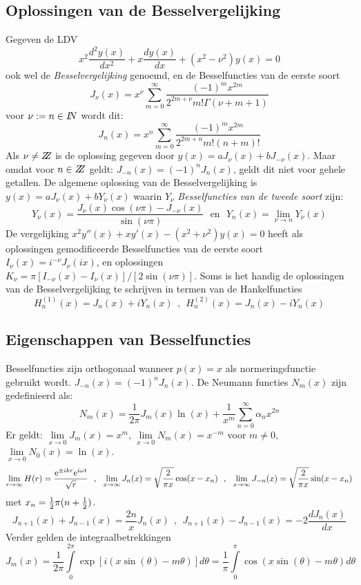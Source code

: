 \documentclass[twoside]{report}
\begin{document}
\subsection{Oplossingen van de Besselvergelijking}
Gegeven de LDV
\[
x^2\frac{d^2y(x)}{dx^2}+x\frac{dy(x)}{dx}+(x^2-\nu^2)y(x)=0
\]
ook wel de {\it Besselvergelijking} genoemd, en de Besselfuncties van de eerste
soort
\[
J_\nu(x)=x^\nu\sum_{m=0}^\infty\frac{(-1)^mx^{2m}}{2^{2m+\nu}m!\Gamma(\nu+m+1)}
\]
voor $\nu:=n\in I\hspace{-1mm}N$ wordt dit:
\[
J_n(x)=x^n\sum_{m=0}^\infty\frac{(-1)^mx^{2m}}{2^{2m+n}m!(n+m)!}
\]
Als $\nu\neq Z\hspace{-1ex}Z$ is de oplossing gegeven door $y(x)=aJ_\nu(x)+bJ_{-\nu}(x)$.
Maar omdat voor $n\in Z\hspace{-1ex}Z$ geldt: $J_{-n}(x)=(-1)^nJ_n(x)$, geldt dit niet voor
gehele getallen. De algemene oplossing van de Besselvergelijking is
$y(x)=aJ_\nu(x)+bY_\nu(x)$ waarin $Y_\nu$ {\it Besselfuncties van de tweede
soort} zijn:
\[
Y_\nu(x)=\frac{J_\nu(x)\cos(\nu\pi)-J_{-\nu}(x)}{\sin(\nu\pi)}~~~\mbox{en}~~~
Y_n(x)=\lim_{\nu\rightarrow n}Y_\nu(x)
\]
De vergelijking $x^2y''(x)+xy'(x)-(x^2+\nu^2)y(x)=0$ heeft als oplossingen
gemodificeerde Besselfuncties van de eerste soort $I_\nu(x)=i^{-\nu}J_\nu(ix)$,
en oplossingen $K_\nu=\pi[I_{-\nu}(x)-I_\nu(x)]/[2\sin(\nu\pi)]$.
\npar
Soms is het handig de oplossingen van de Besselvergelijking te schrijven in
termen van de Hankelfuncties
\[
H^{(1)}_n(x)=J_n(x)+iY_n(x)~~,~~H^{(2)}_n(x)=J_n(x)-iY_n(x)
\]

\subsection{Eigenschappen van Besselfuncties}
Besselfuncties zijn orthogonaal wanneer $p(x)=x$ als normeringsfunctie gebruikt
wordt.
\npar
$J_{-n}(x)=(-1)^nJ_n(x)$. De Neumann functies $N_m(x)$ zijn gedefinieerd als:
\[
N_m(x)=\frac{1}{2\pi}J_m(x)\ln(x)+\frac{1}{x^m}\sum_{n=0}^\infty \alpha_nx^{2n}
\]
Er geldt: $\lim\limits_{x\rightarrow0}J_m(x)=x^m$,
$\lim\limits_{x\rightarrow0}N_m(x)=x^{-m}$ voor $m\neq0$,
$\lim\limits_{x\rightarrow0}N_0(x)=\ln(x)$.
\[
\lim_{r\rightarrow\infty}H(r)=\frac{{\rm e}^{\pm ikr}{\rm e}^{i\omega t}}{\sqrt{r}}~~,~~
\lim_{x\rightarrow\infty}J_n(x)=\sqrt{\frac{2}{\pi x}}\cos(x-x_n)~~,~~
\lim_{x\rightarrow\infty}J_{-n}(x)=\sqrt{\frac{2}{\pi x}}\sin(x-x_n)
\]
met $x_n=\mbox{$\frac{1}{2}$}\pi(n+\mbox{$\frac{1}{2}$})$.
\[
J_{n+1}(x)+J_{n-1}(x)=\frac{2n}{x}J_n(x)~~,~~J_{n+1}(x)-J_{n-1}(x)=-2\frac{dJ_n(x)}{dx}
\]
Verder gelden de integraalbetrekkingen
\[
J_m(x)=\frac{1}{2\pi}\int\limits_0^{2\pi}\exp[i(x\sin(\theta)-m\theta)]d\theta=
\frac{1}{\pi}\int\limits_0^\pi\cos(x\sin(\theta)-m\theta)d\theta
\]
\end{document}
